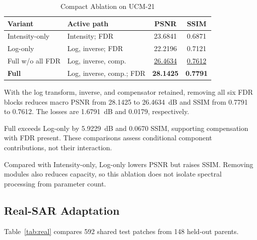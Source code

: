 \documentclass[journal]{IEEEtran}
\begin{document}
\begin{table}[!t]
\caption{Compact Ablation on UCM-21}
\label{tab:ablation}
\centering
\footnotesize
\setlength{\tabcolsep}{2.7pt}
\renewcommand{\arraystretch}{1.08}
\begin{tabularx}{\columnwidth}{@{}lXcc@{}}
\toprule
\textbf{Variant} & \textbf{Active path} & \textbf{PSNR} & \textbf{SSIM} \\
\midrule
Intensity-only & Intensity; FDR & 23.6841 & 0.6871 \\
Log-only & Log, inverse; FDR & 22.2196 & 0.7121 \\
Full w/o all FDR & Log, inverse, comp. & \underline{26.4634} & \underline{0.7612} \\
\textbf{Full} & Log, inverse, comp.; FDR & \textbf{28.1425} & \textbf{0.7791} \\
\bottomrule
\end{tabularx}
\end{table}

With the log transform, inverse, and compensator retained, removing all six FDR blocks reduces macro PSNR from 28.1425 to 26.4634~dB and SSIM from 0.7791 to 0.7612. The losses are 1.6791~dB and 0.0179, respectively.

Full exceeds Log-only by 5.9229~dB and 0.0670 SSIM, supporting compensation with FDR present. These comparisons assess conditional component contributions, not their interaction.

Compared with Intensity-only, Log-only lowers PSNR but raises SSIM. Removing modules also reduces capacity, so this ablation does not isolate spectral processing from parameter count.

\subsection{Real-SAR Adaptation}
Table~\ref{tab:real} compares 592 shared test patches from 148 held-out parents.
\end{document}
